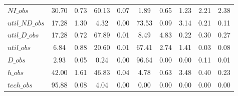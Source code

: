 \begin{center}
\begin{longtable}{lccccccccc}
$NI\_obs        $	 & 	        30.70	 & 	         0.73	 & 	        60.13	 & 	         0.07	 & 	         1.89	 & 	         0.65	 & 	         1.23	 & 	         2.21	 & 	         2.38 \\ 
$util\_ND\_obs  $	 & 	        17.28	 & 	         1.30	 & 	         4.32	 & 	         0.00	 & 	        73.53	 & 	         0.09	 & 	         3.14	 & 	         0.21	 & 	         0.11 \\ 
$util\_D\_obs   $	 & 	        17.28	 & 	         0.72	 & 	        67.89	 & 	         0.01	 & 	         8.49	 & 	         4.83	 & 	         0.22	 & 	         0.30	 & 	         0.27 \\ 
$util\_obs      $	 & 	         6.84	 & 	         0.88	 & 	        20.60	 & 	         0.01	 & 	        67.41	 & 	         2.74	 & 	         1.41	 & 	         0.03	 & 	         0.08 \\ 
$D\_obs         $	 & 	         2.93	 & 	         0.05	 & 	         0.24	 & 	         0.00	 & 	        96.64	 & 	         0.00	 & 	         0.00	 & 	         0.11	 & 	         0.01 \\ 
$h\_obs         $	 & 	        42.00	 & 	         1.61	 & 	        46.83	 & 	         0.04	 & 	         4.78	 & 	         0.63	 & 	         3.48	 & 	         0.40	 & 	         0.23 \\ 
$tech\_obs      $	 & 	        95.88	 & 	         0.08	 & 	         4.04	 & 	         0.00	 & 	         0.00	 & 	         0.00	 & 	         0.00	 & 	         0.00	 & 	         0.00 \\ 
\end{longtable}
 \end{center}
